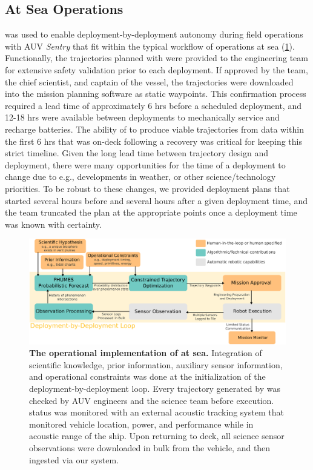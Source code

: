 \subsection{At Sea Operations}
\PHORTEX was used to enable deployment-by-deployment autonomy during field operations with AUV \emph{Sentry} that fit within the typical workflow of operations at sea (\cref{fig:at_sea_ops}). Functionally, the trajectories planned with \PHORTEX were provided to the \Sentry engineering team for extensive safety validation prior to each deployment. If approved by the \Sentry team, the chief scientist, and captain of the vessel, the trajectories were downloaded into the \Sentry mission planning software as static waypoints. This confirmation process required a lead time of approximately 6 hrs before a scheduled deployment, and 12-18 hrs were available between deployments to mechanically service \Sentry and recharge batteries. The ability of \PHORTEX to produce viable trajectories from data within the first 6 hrs that \Sentry was on-deck following a recovery was critical for keeping this strict timeline. Given the long lead time between trajectory design and \Sentry deployment, there were many opportunities for the time of a deployment to change due to e.g., developments in weather, or other science/technology priorities. To be robust to these changes, we provided deployment plans that started several hours before and several hours after a given deployment time, and the \Sentry team truncated the plan at the appropriate points once a deployment time was known with certainty.

\begin{figure}[h!]
    \centering
    \includegraphics[width=1.0\columnwidth]{figures/deployment_loop.png}
    \caption[The operational implementation of \PHORTEX at sea.]{\textbf{The operational implementation of \PHORTEX at sea.} Integration of scientific knowledge, prior information, auxiliary sensor information, and operational constraints was done at the initialization of the \PHORTEX deployment-by-deployment loop. Every trajectory generated by \PHORTEX was checked by AUV \Sentry engineers and the science team before execution. \Sentry status was monitored with an external acoustic tracking system that monitored vehicle location, power, and performance while in acoustic range of the ship. Upon returning to deck, all science sensor observations were downloaded in bulk from the vehicle, and then ingested via our \PHORTEX system.}
    \label{fig:at_sea_ops}
\end{figure}

